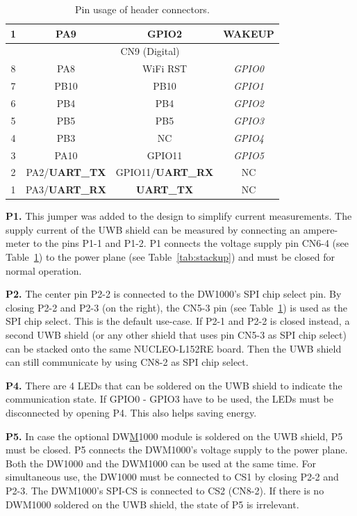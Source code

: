 \documentclass[journal,comsoc]{IEEEtran}
\begin{document}
\begin{table} [h!]
\begin{tabular}{|c|c|c|c|}
	1 & PA9 & GPIO2 & WAKEUP \\ \hline\hline
	  & \multicolumn{3}{c|}{CN9 (Digital)} \\ \cline{2-4}
	8 & PA8 & WiFi RST & \textit{GPIO0} \\ \cline{2-4}
	7 & PB10 & PB10 & \textit{GPIO1} \\ \cline{2-4}
	6 & PB4 & PB4 & \textit{GPIO2} \\ \cline{2-4}
	5 & PB5 & PB5 & \textit{GPIO3} \\ \cline{2-4}
	4 & PB3 & NC & \textit{GPIO4} \\ \cline{2-4}
	3 & PA10 & GPIO11 & \textit{GPIO5} \\ \cline{2-4}
	2 & PA2/\textbf{UART\_TX} & GPIO11/\textbf{UART\_RX} & NC \\ \cline{2-4}
	1 & PA3/\textbf{UART\_RX} & \textbf{UART\_TX} & NC \\ \hline
	\end{tabular}
	\caption{Pin usage of header connectors.}
	\label{tab:headerconnectors}
\end{table}

\vspace*{0.5em}
\noindent\textbf{P1.} This jumper was added to the design to simplify current measurements.
The supply current of the UWB shield can be measured by connecting an ampere-meter to the pins P1-1 and P1-2.
P1 connects the voltage supply pin CN6-4 (see Table~\ref{tab:headerconnectors}) to the power plane (see Table~\ref{tab:stackup}) and must be closed for normal operation.

\vspace*{0.5em}
\noindent\textbf{P2.} The center pin P2-2 is connected to the DW1000's SPI chip select pin.
By closing P2-2 and P2-3 (on the right), the CN5-3 pin (see Table~\ref{tab:headerconnectors}) is used as the SPI chip select. 
This is the default use-case.
If P2-1 and P2-2 is closed instead, a second UWB shield (or any other shield that uses pin CN5-3 as SPI chip select) can be stacked onto the same NUCLEO-L152RE board.
Then the UWB shield can still communicate by using CN8-2 as SPI chip select.

\vspace*{0.5em}
\noindent\textbf{P4.} There are 4 LEDs that can be soldered on the UWB shield to indicate the communication state.
If GPIO0 - GPIO3 have to be used, the LEDs must be disconnected by opening P4.
This also helps saving energy.

\vspace*{0.5em}
\noindent\textbf{P5.} In case the optional DW\underline{M}1000 module is soldered on the UWB shield, P5 must be closed.
P5 connects the DWM1000's voltage supply to the power plane.
Both the DW1000 and the DWM1000 can be used at the same time. 
For simultaneous use, the DW1000 must be connected to CS1 by closing P2-2 and P2-3. 
The DWM1000's SPI-CS is connected to CS2 (CN8-2).
If there is no DWM1000 soldered on the UWB shield, the state of P5 is irrelevant.
\end{document}

